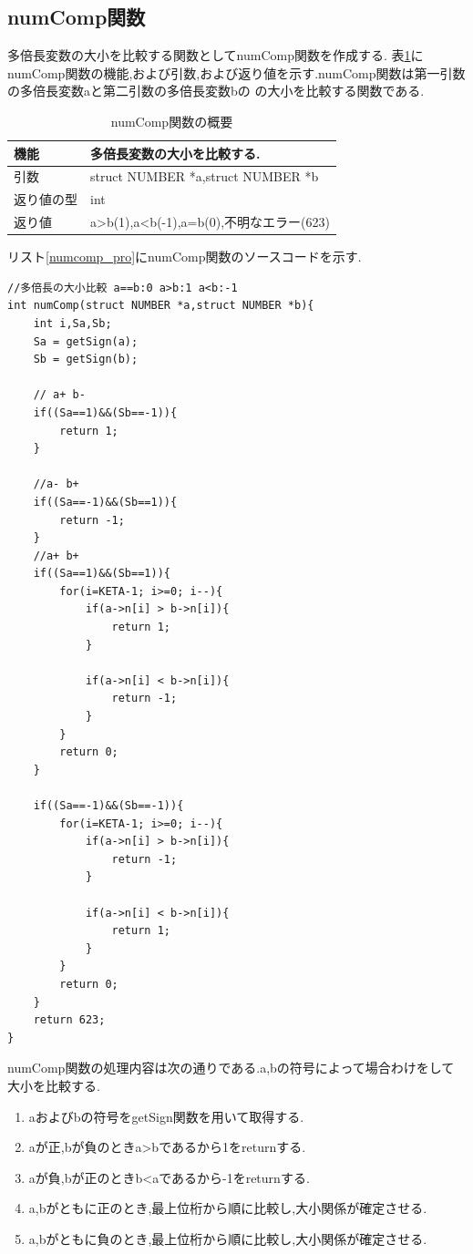 \documentclass[a4j] {jarticle}
\begin{document}
\subsection{numComp関数}
多倍長変数の大小を比較する関数としてnumComp関数を作成する.
表\ref{numComp}にnumComp関数の機能,および引数,および返り値を示す.numComp関数は第一引数の多倍長変数aと第二引数の多倍長変数bの
の大小を比較する関数である.
\begin{table}[H]
  \caption{numComp関数の概要}
  \label{numComp}
  \begin{center}
      \begin{tabular}{|l|l|}\hline
      機能 & 多倍長変数の大小を比較する.\\ \hline
      引数 & struct NUMBER *a,struct NUMBER *b\\ \hline
      返り値の型 & int\\ \hline
      返り値 & a>b(1),a<b(-1),a=b(0),不明なエラー(623)\\ \hline
      \end{tabular}
  \end{center}
  \end{table}
  
  リスト\ref{numcomp_pro}にnumComp関数のソースコードを示す.
\begin{lstlisting}[basicstyle=\ttfamily\footnotesize, frame=single,label=numcomp_pro,caption=numComp関数のソースコード]
//多倍長の大小比較 a==b:0 a>b:1 a<b:-1
int numComp(struct NUMBER *a,struct NUMBER *b){
    int i,Sa,Sb;
    Sa = getSign(a);
    Sb = getSign(b);

    // a+ b-
    if((Sa==1)&&(Sb==-1)){
        return 1;
    }

    //a- b+
    if((Sa==-1)&&(Sb==1)){
        return -1;
    }
    //a+ b+
    if((Sa==1)&&(Sb==1)){
        for(i=KETA-1; i>=0; i--){
            if(a->n[i] > b->n[i]){
                return 1;
            }

            if(a->n[i] < b->n[i]){
                return -1;
            }
        }
        return 0;
    }

    if((Sa==-1)&&(Sb==-1)){
        for(i=KETA-1; i>=0; i--){
            if(a->n[i] > b->n[i]){
                return -1;
            }

            if(a->n[i] < b->n[i]){
                return 1;
            }
        }
        return 0;
    }
    return 623;
}
\end{lstlisting}

numComp関数の処理内容は次の通りである.a,bの符号によって場合わけをして大小を比較する.
  \begin{enumerate}
    \item aおよびbの符号をgetSign関数を用いて取得する.
    \item aが正,bが負のときa>bであるから1をreturnする.
    \item aが負,bが正のときb<aであるから-1をreturnする.
    \item a,bがともに正のとき,最上位桁から順に比較し,大小関係が確定させる.
    \item a,bがともに負のとき,最上位桁から順に比較し,大小関係が確定させる.
  \end{enumerate}
\end{document}
